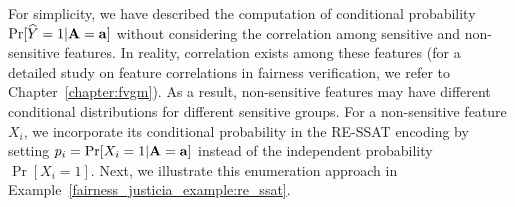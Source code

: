 For simplicity, we have described the computation of conditional probability $ \Pr[\widehat{Y} = 1 | \mathbf{A} = \mathbf{a}] $ without considering the correlation among sensitive and non-sensitive features. In reality, correlation exists among these features (for a detailed study on feature correlations in fairness verification, we refer to Chapter~\ref{chapter:fvgm}). As a result, non-sensitive features may have different conditional distributions for different sensitive groups. For a non-sensitive feature $ X_i $, we incorporate its conditional probability in the RE-SSAT encoding by setting $ p_i = \Pr[X_i = 1| \mathbf{A} =\mathbf{a}] $ instead of the independent probability $\Pr[X_i = 1]$. Next, we illustrate this enumeration approach in Example~\ref{fairness_justicia_example:re_ssat}.

